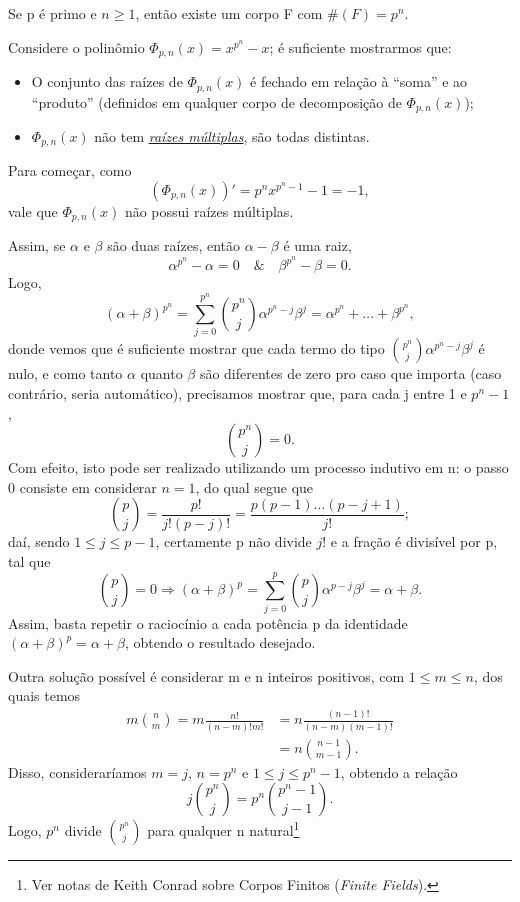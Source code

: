 \documentclass[../algebraIII_notes.tex]{subfiles}
\begin{document}
\begin{theorem*}
	Se p é primo e \(n\geq 1\), então existe um corpo F com \(\#(F) = p^{n}\).
\end{theorem*}
\begin{proof*}
	Considere o polinômio \(\Phi_{p, n}(x) = x^{p^{n}}-x\); é suficiente mostrarmos que:
	\begin{itemize}
		\item O conjunto das raízes de \(\Phi_{p, n}(x)\) é fechado em relação à ``soma'' e ao ``produto'' (definidos em qualquer corpo de decomposição de \(\Phi_{p, n}(x)\));
		\item \(\Phi_{p, n}(x)\) não tem \hyperlink{multiple_roots}{\textit{raízes múltiplas}}, são todas distintas.
	\end{itemize}

	Para começar, como
	\[
		(\Phi_{p, n}(x))' = p^{n}x^{p^{n}-1}-1 = -1,
	\]
	vale que \(\Phi_{p, n}(x)\) não possui raízes múltiplas.

	Assim, se \(\alpha \) e \(\beta \) são duas raízes, então \(\alpha - \beta \) é uma raiz,
	\[
		\alpha^{p^{n}} - \alpha  = 0 \quad\&\quad \beta^{p^{n}}-\beta  = 0.
	\]
	Logo,
	\[
		(\alpha +\beta)^{p^{n}}=\sum\limits_{j=0}^{p^{n}}\binom{p^{n}}{j}\alpha^{p^{n}-j}\beta^{j} = \alpha^{p^{n}} + \dotsc + \beta^{p^{n}},
	\]
	donde vemos que é suficiente mostrar que cada termo do tipo \(\binom{p^{n}}{j}\alpha^{p^{n}-j}\beta^{j}\) é nulo, e como tanto \(\alpha \) quanto \(\beta \) são diferentes de zero pro caso que importa (caso contrário, seria automático), precisamos mostrar que, para cada j entre 1 e \(p^{n}-1\),
	\[
		\binom{p^{n}}{j} = 0.
	\]
	Com efeito, isto pode ser realizado utilizando um processo indutivo em n: o passo 0 consiste em considerar \(n=1\), do qual segue que
	\[
		\binom{p}{j} = \frac{p!}{j!(p-j)!} = \frac{p(p-1)\dotsc (p-j+1)}{j!};
	\]
	daí, sendo \(1\leq j\leq p-1\), certamente p não divide \(j!\) e a fração é divisível por p, tal que
	\[
		\binom{p}{j} = 0 \Rightarrow (\alpha +\beta )^{p} = \sum\limits_{j=0}^{p}\binom{p}{j}\alpha^{p-j}\beta^{j} = \alpha +\beta.
	\]
	Assim, basta repetir o raciocínio a cada potência p da identidade \((\alpha +\beta )^{p} = \alpha + \beta \), obtendo o resultado desejado.

	Outra solução possível é considerar m e n inteiros positivos, com \(1\leq m\leq n\), dos quais temos
	\begin{align*}
		m \binom{n}{m} = m \frac{n!}{(n-m)!m!} & = n \frac{(n-1)!}{(n-m)(m-1)!} \\
		                                       & = n \binom{n-1}{m-1}.
	\end{align*}
	Disso, consideraríamos \(m=j\), \(n=p^{n}\) e \(1\leq j\leq p^{n}-1\), obtendo a relação
	\[
		j \binom{p^{n}}{j} = p^{n}\binom{p^{n}-1}{j-1}.
	\]
	Logo, \(p^{n}\) divide \(\binom{p^{n}}{j}\) para qualquer n natural\footnote{Ver notas de Keith Conrad sobre Corpos Finitos (\textit{Finite Fields}).}


\end{proof*}
\end{document}
